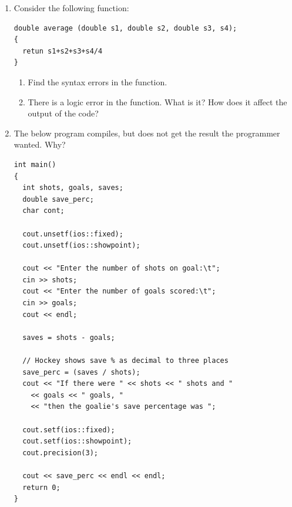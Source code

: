 \begin{enumerate}
	\item Consider the following function:
	
\noindent\begin{minipage}{\linewidth}\begin{lstlisting}
double average (double s1, double s2, double s3, s4);
{
  retun s1+s2+s3+s4/4
}
\end{lstlisting}\end{minipage}

		\begin{enumerate}
		\item Find the syntax errors in the function.
		\item There is a logic error in the function. What is it? How does it affect the output of the code?
		\end{enumerate}

  \item The below program compiles, but does not get the result the programmer wanted. Why? \nopagebreak[4]

\noindent\begin{minipage}{\linewidth}\begin{lstlisting}
int main()
{
  int shots, goals, saves;
  double save_perc;
  char cont;

  cout.unsetf(ios::fixed);
  cout.unsetf(ios::showpoint);

  cout << "Enter the number of shots on goal:\t";
  cin >> shots;
  cout << "Enter the number of goals scored:\t";
  cin >> goals;
  cout << endl;

  saves = shots - goals;

  // Hockey shows save % as decimal to three places
  save_perc = (saves / shots); 
  cout << "If there were " << shots << " shots and " 
    << goals << " goals, " 
    << "then the goalie's save percentage was ";

  cout.setf(ios::fixed);
  cout.setf(ios::showpoint);
  cout.precision(3);
  
  cout << save_perc << endl << endl;
  return 0;
}
\end{lstlisting}\end{minipage}


\end{enumerate}


